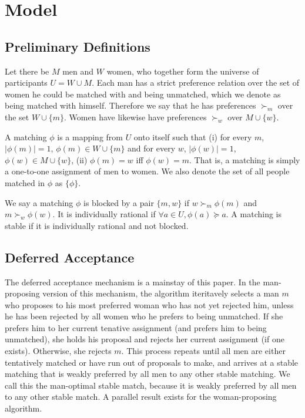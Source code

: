 \documentclass[WP]{AEA}
\begin{document}
\section{Model}
\subsection{Preliminary Definitions}

Let there be $M$ men and $W$ women, who together form the universe of participants $U = W \cup M$.  Each man has a strict preference relation over the set of women he could be matched with and being unmatched, which we denote as being matched with himself. Therefore we say that he has preferences $\succ_{m}$ over the set $W \cup \{m\}$. Women have likewise have preferences $\succ_w$ over $M \cup \{w\}$. 

A matching $\phi$ is a mapping from $U$ onto itself such that (i) for every $m$, $|\phi(m)| = 1$, $\phi(m) \in W \cup \{m\} $ and for every  $w$, $|\phi(w)| = 1$, $\phi(w) \in M \cup \{w\}$, (ii) $\phi(m) = w$ iff $\phi(w) = m$.  That is, a matching is simply a one-to-one assignment of men to women. We also denote the set of all people matched in $\phi$ as $\{\phi\}$.

We say a matching $\phi$ is blocked by a pair $\{m,w\}$ if $w \succ_m \phi(m)$ and $m \succ_w \phi(w)$. It is individually rational if $\forall a \in U ,\phi(a) \succeq a$. A matching is stable if it is individually rational and not blocked.

\subsection{Deferred Acceptance}
The deferred acceptance mechanism is a mainstay of this paper. In the man-proposing version of this mechanism, the algorithm iteritavely selects a man $m$ who proposes to his most preferred woman who has not yet rejected him, unless he has been rejected by all women who he prefers to being unmatched.  If she prefers him to her current tenative assignment (and prefers him to being unmatched), she holds his proposal and rejects her current assignment (if one exists). Otherwise, she rejects $m$.  This process repeats until all men are either tentatively matched or have run out of proposals to make, and arrives at a stable matching that is weakly preferred by all men to any other stable matching.  We call this the man-optimal stable match, because it is weakly preferred by all men to any other stable match.  A parallel result exists for the woman-proposing algorithm.
\end{document}
